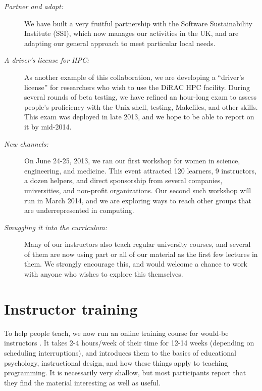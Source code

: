 \documentclass[10pt,a4paper,twocolumn]{article}
\begin{document}
\begin{description}

\item[\emph{Partner and adapt:}] We have built a very fruitful
  partnership with the Software Sustainability Institute (SSI), which
  now manages our activities in the UK, and are adapting our general
  approach to meet particular local needs.

\item[\emph{A driver's license for HPC:}] As another example of this
  collaboration, we are developing a ``driver's license'' for
  researchers who wish to use the DiRAC HPC facility. During several
  rounds of beta testing, we have refined an hour-long exam to assess
  people's proficiency with the Unix shell, testing, Makefiles, and
  other skills. This exam was deployed in late 2013, and we hope to be
  able to report on it by mid-2014.

\item[\emph{New channels:}] On June 24-25, 2013, we ran our first
  workshop for women in science, engineering, and medicine. This event
  attracted 120 learners, 9 instructors, a dozen helpers, and direct
  sponsorship from several companies, universities, and non-profit
  organizations. Our second such workshop will run in March 2014, and
  we are exploring ways to reach other groups that are
  underrepresented in computing.

\item[\emph{Smuggling it into the curriculum:}] Many of our instructors
  also teach regular university courses, and several of them are now
  using part or all of our material as the first few lectures in
  them. We strongly encourage this, and would welcome a chance to work
  with anyone who wishes to explore this themselves.

\end{description}

\section*{Instructor training}

To help people teach, we now run an online training course for
would-be instructors \cite{swctraining}. It takes 2-4 hours/week of
their time for 12-14 weeks (depending on scheduling interruptions),
and introduces them to the basics of educational psychology,
instructional design, and how these things apply to teaching
programming. It is necessarily very shallow, but most participants
report that they find the material interesting as well as useful.
\end{document}
